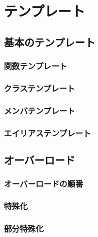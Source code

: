 \section{テンプレート}

\subsection{基本のテンプレート}

\subsubsection*{関数テンプレート}

\subsubsection*{クラステンプレート}

\subsubsection*{メンバテンプレート}

\subsubsection*{エイリアステンプレート}

\subsection{オーバーロード}

\subsubsection{オーバーロードの順番}

\subsubsection{特殊化}

\subsubsection{部分特殊化}
